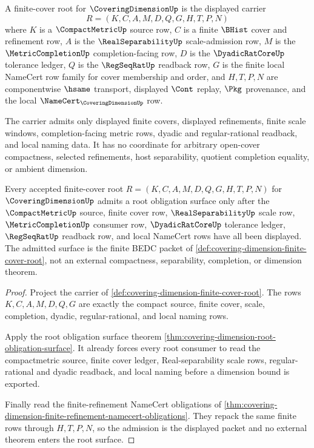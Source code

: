 \begin{definition}
\label{def:covering-dimension-finite-cover-root}
A finite-cover root for $\CoveringDimensionUp$ is the displayed carrier
$$
R=(K,C,A,M,D,Q,G,H,T,P,N)
$$
where $K$ is a $\CompactMetricUp$ source row, $C$ is a finite $\BHist$ cover and refinement row, $A$ is the $\RealSeparabilityUp$ scale-admission row, $M$ is the $\MetricCompletionUp$ completion-facing row, $D$ is the $\DyadicRatCoreUp$ tolerance ledger, $Q$ is the $\RegSeqRatUp$ readback row, $G$ is the finite local NameCert row family for cover membership and order, and $H,T,P,N$ are componentwise $\hsame$ transport, displayed $\Cont$ replay, $\Pkg$ provenance, and the local $\NameCert_{\CoveringDimensionUp}$ row.

The carrier admits only displayed finite covers, displayed refinements, finite scale windows, completion-facing metric rows, dyadic and regular-rational readback, and local naming data. It has no coordinate for arbitrary open-cover compactness, selected refinements, host separability, quotient completion equality, or ambient dimension.
\end{definition}

\begin{theorem}
\label{thm:covering-dimension-finite-cover-root-admission}
Every accepted finite-cover root $R=(K,C,A,M,D,Q,G,H,T,P,N)$ for $\CoveringDimensionUp$ admits a root obligation surface only after the $\CompactMetricUp$ source, finite cover row, $\RealSeparabilityUp$ scale row, $\MetricCompletionUp$ consumer row, $\DyadicRatCoreUp$ tolerance ledger, $\RegSeqRatUp$ readback row, and local NameCert rows have all been displayed. The admitted surface is the finite BEDC packet of \autoref{def:covering-dimension-finite-cover-root}, not an external compactness, separability, completion, or dimension theorem.
\end{theorem}
\begin{proof}
Project the carrier of \autoref{def:covering-dimension-finite-cover-root}. The rows $K,C,A,M,D,Q,G$ are exactly the compact source, finite cover, scale, completion, dyadic, regular-rational, and local naming rows.

Apply the root obligation surface theorem \autoref{thm:covering-dimension-root-obligation-surface}. It already forces every root consumer to read the compactmetric source, finite cover ledger, Real-separability scale rows, regular-rational and dyadic readback, and local naming before a dimension bound is exported.

Finally read the finite-refinement NameCert obligations of \autoref{thm:covering-dimension-finite-refinement-namecert-obligations}. They repack the same finite rows through $H,T,P,N$, so the admission is the displayed packet and no external theorem enters the root surface.
\end{proof}

